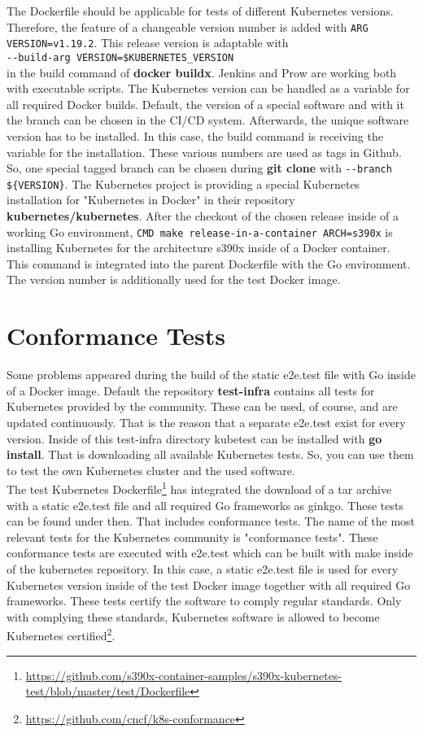 The Dockerfile should be applicable for tests of different Kubernetes versions. Therefore, the feature of a changeable version number is added with \lstinline!ARG VERSION=v1.19.2!. This release version is adaptable with \\
\verb+--build-arg VERSION=$KUBERNETES_VERSION+ \\
in the build command of \textbf{docker buildx}.
Jenkins and Prow are working both with executable scripts. The Kubernetes version can be handled as a variable for all required Docker builds.
Default, the version of a special software and with it the branch can be chosen in the \gls{CI/CD} system. Afterwards, the unique software version has to be installed. In this case, the build command is receiving the variable for the installation. These various numbers are used as tags in Github. So, one special tagged branch can be chosen during \textbf{git clone} with \verb+--branch ${VERSION}+.
The Kubernetes project is providing a special Kubernetes installation for "Kubernetes in Docker" in their repository \textbf{kubernetes/kubernetes}.
After the checkout of the chosen release inside of a working Go environment, \verb+CMD make release-in-a-container ARCH=s390x+ is installing Kubernetes for the architecture s390x inside of a Docker container. \\
This command is integrated into the parent Dockerfile with the Go environment. The version number is additionally used for the test Docker image.


\section{Conformance Tests}

Some problems appeared during the build of the static e2e.test file with Go inside of a Docker image. 
Default the repository \textbf{test-infra} contains all tests for Kubernetes provided by the community. 
These can be used, of course, and are updated continuously. That is the reason that a separate e2e.test exist for every version. Inside of this test-infra directory kubetest can be installed with \textbf{go install}. 
That is downloading all available Kubernetes tests. So, you can use them to test the own Kubernetes cluster and the used software. \\

The test Kubernetes Dockerfile\footnote{\url{https://github.com/s390x-container-samples/s390x-kubernetes-test/blob/master/test/Dockerfile}} has integrated the download of a tar archive with a static e2e.test file and all required Go frameworks as ginkgo.
These tests can be found under  then. That includes conformance tests.
The name of the most relevant tests for the Kubernetes community is "conformance tests". These conformance tests are executed with e2e.test  which can be built with make inside of the kubernetes repository. 
In this case, a static e2e.test file is used for every Kubernetes version inside of the test Docker image together with all required Go frameworks. These tests certify the software to comply regular standards. Only with complying these standards, Kubernetes software is allowed to become Kubernetes certified\footnote{\url{https://github.com/cncf/k8s-conformance}}. 

